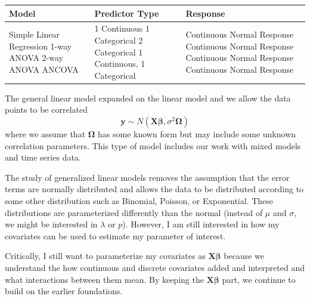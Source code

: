 \documentclass[]{book}
\theoremstyle{definition}
\theoremstyle{definition}
\theoremstyle{remark}
\begin{document}
\begin{longtable}[]{@{}lll@{}}
\toprule
\begin{minipage}[b]{0.28\columnwidth}\raggedright\strut
Model\strut
\end{minipage} & \begin{minipage}[b]{0.31\columnwidth}\raggedright\strut
Predictor Type\strut
\end{minipage} & \begin{minipage}[b]{0.31\columnwidth}\raggedright\strut
Response\strut
\end{minipage}\tabularnewline
\midrule
\endhead
\begin{minipage}[t]{0.28\columnwidth}\raggedright\strut
Simple Linear Regression 1-way ANOVA 2-way ANOVA ANCOVA\strut
\end{minipage} & \begin{minipage}[t]{0.31\columnwidth}\raggedright\strut
1 Continuous 1 Categorical 2 Categorical 1 Continuous, 1
Categorical\strut
\end{minipage} & \begin{minipage}[t]{0.31\columnwidth}\raggedright\strut
Continuous Normal Response Continuous Normal Response Continuous Normal
Response Continuous Normal Response\strut
\end{minipage}\tabularnewline
\bottomrule
\end{longtable}

The general linear model expanded on the linear model and we allow the
data points to be correlated
\[\boldsymbol{y}\sim N\left(\boldsymbol{X\beta},\sigma^{2}\boldsymbol{\Omega}\right)\]
where we assume that \(\boldsymbol{\Omega}\) has some known form but may
include some unknown correlation parameters. This type of model includes
our work with mixed models and time series data.

The study of generalized linear models removes the assumption that the
error terms are normally distributed and allows the data to be
distributed according to some other distribution such as Binomial,
Poisson, or Exponential. These distributions are parameterized
differently than the normal (instead of \(\mu\) and \(\sigma\), we might
be interested in \(\lambda\) or \(p\)). However, I am still interested
in how my covariates can be used to estimate my parameter of interest.

Critically, I still want to parameterize my covariates as
\(\boldsymbol{X\beta}\) because we understand the how continuous and
discrete covariates added and interpreted and what interactions between
them mean. By keeping the \(\boldsymbol{X\beta}\) part, we continue to
build on the earlier foundations.
\end{document}
